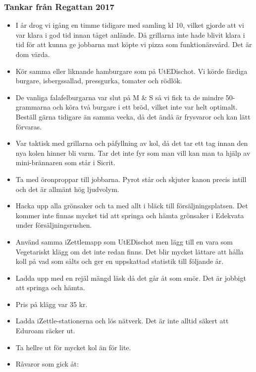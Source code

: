 \documentclass[10pt]{article}
\begin{document}
\subsubsection*{Tankar från Regattan 2017}
\begin{itemize}
	\item I år drog vi igång en timme tidigare med samling kl 10, vilket gjorde att vi var klara i god tid innan tåget anlände. Då grillarna inte hade blivit klara i tid för att kunna ge jobbarna mat köpte vi pizza som funktionärsvård. Det är dom värda.
    \item Kör samma eller liknande hamburgare som på UtEDischot. Vi körde färdiga burgare, isbergssallad, pressgurka, tomater och rödlök.
    \item De vanliga falafelburgarna var slut på M \& S så vi fick ta de mindre 50-grammarna och köra två burgare i ett bröd, vilket inte var helt optimalt. Beställ gärna tidigare än samma vecka, då det ändå är frysvaror och kan lätt förvaras.
    \item Var taktisk med grillarna och påfyllning av kol, då det tar ett tag innan den nya kolen hinner bli varm. Tar det inte fyr som man vill kan man ta hjälp av mini-brännaren som står i Sicrit.
    \item Ta med öronproppar till jobbarna. Pyrot står och skjuter kanon precis intill och
det är allmänt hög ljudvolym.
	\item Hacka upp alla grönsaker och ta med allt i bläck till försäljningsplatsen. Det kommer inte finnas mycket tid att springa och hämta grönsaker i Edekvata under försäljningsrushen.
    \item Använd samma iZettlemapp som UtEDischot men lägg till en vara som Vegetariskt klägg om det inte redan finns. Det blir mycket lättare att hålla koll på vad som sålts och ger en uppskattad statistik till följande år.
    \item Ladda upp med en rejäl mängd läsk då det går åt som smör. Det är jobbigt att springa och hämta.
    \item Pris på klägg var 35 kr.
    \item Ladda iZettle-stationerna och lös nätverk. Det är inte alltid säkert att Eduroam räcker ut.
    \item Ta hellre ut för mycket kol än för lite.
    \item Råvaror som gick åt:
\end{itemize}
\end{document}
